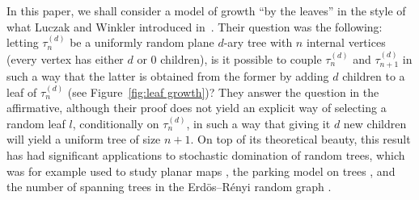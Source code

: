 \documentclass[11pt]{article}
\begin{document}
In this paper, we shall consider a model of growth ``by the leaves'' in the style of what Luczak and Winkler introduced in~\cite{LW04}. Their question was the following: letting $\tau^{(d)}_n$ be a uniformly random plane $d$-ary tree with $n$ internal vertices (every vertex has either $d$ or $0$ children), is it possible to couple $\tau^{(d)}_n$ and $\tau^{(d)}_{n+1}$ in such a way that the latter is obtained from the former by adding $d$ children to a leaf of $\tau^{(d)}_n$ (see Figure~\ref{fig:leaf growth})? They answer the question in the affirmative, although their proof does not yield an explicit way of selecting a random leaf $l$, conditionally on $\tau^{(d)}_n$, in such a way that giving it $d$ new children will yield a uniform tree of size $n+1$. On top of its theoretical beauty, this result has had significant applications to stochastic domination of random trees, which was for example used to study planar maps \cite{addario2014growing, CS23}, the parking model on trees  \cite{goldschmidt2019parking}, and the number of spanning trees in the Erd\"os--R\'enyi random graph \cite{lyons2008growth}.
\end{document}
